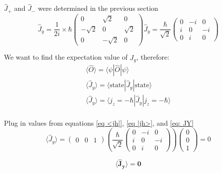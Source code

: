 \documentclass[12pt]{article}
\begin{document}
        $\hat{J}_+$ and $\hat{J}_-$ were determined in the previous section
        \begin{equation} \label{eq: JY}
            \hat{J}_y = \frac{1}{2i} \times \hbar
            \begin{pmatrix}
                0 & \sqrt{2} & 0 \\
                -\sqrt{2} & 0 & \sqrt{2} \\
                0 & -\sqrt{2} & 0
            \end{pmatrix}
            \hat{J}_y = \frac{\hbar}{\sqrt{2}}
            \begin{pmatrix}
                0 & -i & 0 \\
                i & 0 & -i \\
                0 & i & 0
            \end{pmatrix}
        \end{equation}

        We want to find the expectation value of $\hat{J}_y$, therefore:
        \begin{align*}
            \langle \hat{O} \rangle = \langle \psi | \hat{O} | \psi \rangle \\
            \langle \hat{J}_y \rangle = \langle \text{state} | \hat{J}_y | \text{state} \rangle \\
            \langle \hat{J}_y \rangle = \langle j_z = - \hbar | \hat{J}_y | j_z = -\hbar \rangle \\
        \end{align*}

        Plug in values from equations \ref{eq <jh|}, \ref{eq |jh>}, and \ref{eq: JY}
        \[
            \langle \hat{J}_y \rangle = \begin{pmatrix}
                0 & 0 & 1
            \end{pmatrix} \left( \frac{\hbar}{\sqrt{2}} \begin{pmatrix}
                0 & -i & 0 \\
                i & 0 & -i \\
                0 & i & 0
            \end{pmatrix} \right) \begin{pmatrix}
                0 \\ 0 \\ 1
            \end{pmatrix} = 0
        \]

        \[
            \boldsymbol{\boxed{\langle \hat{J}_y \rangle = 0}}
        \]
\end{document}
